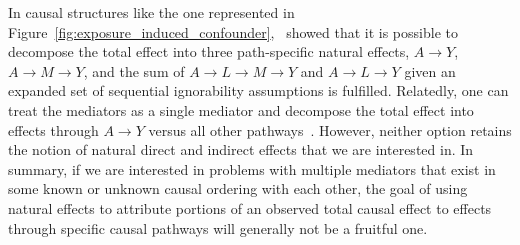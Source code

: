 In causal structures like the one represented in 
Figure~\ref{fig:exposure_induced_confounder},~\cite{avinetal2005} showed that it is possible to 
decompose the total effect into three path-specific natural effects, $A \rightarrow Y$, 
$A \rightarrow M \rightarrow Y$, and the sum of $A \rightarrow L \rightarrow M \rightarrow Y$ and
$A \rightarrow L \rightarrow Y$ given an expanded set of sequential ignorability assumptions is fulfilled. 
Relatedly, one can treat the mediators as a single mediator and decompose the total effect into effects through
$A \rightarrow Y$ versus all other pathways~\citep{vanderweeleetal2014}. However, neither option retains the notion
of natural direct and indirect effects that we are interested in. In summary, if we are interested in problems with 
multiple mediators that exist in some known or unknown causal ordering with each other, the goal of using natural 
effects to attribute portions of an observed total causal effect to effects through specific causal pathways will 
generally not be a fruitful one. 

